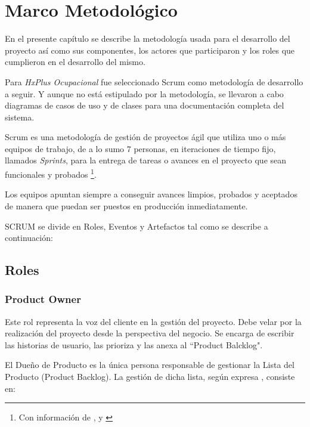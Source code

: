 \chapter{Marco Metodológico}

    En el presente capítulo se describe la metodología usada para el desarrollo del proyecto así como sus componentes, los actores que participaron y los roles que cumplieron en el desarrollo del mismo.

    Para \textit{HxPlus Ocupacional} fue seleccionado Scrum como metodología de desarrollo a seguir. Y aunque no está estipulado por la metodología, se llevaron a cabo diagramas de casos de uso y de clases para una documentación completa del sistema.
    
    Scrum es una metodología de gestión de proyectos ágil que utiliza uno o más equipos de trabajo, de a lo sumo 7 personas, en iteraciones de tiempo fijo, llamados \textit{Sprints}, para la entrega de tareas o avances en el proyecto que sean funcionales y probados
    \footnote{Con información de \citeauthor{scrum-guia}\cite{scrum-guia}, \citeauthor{scrum-primer}\cite{scrum-primer} y \citeauthor{scrum-agile}\cite{scrum-agile}}.    
    
    Los equipos apuntan siempre a conseguir avances limpios, probados y aceptados de manera que puedan ser puestos en producción inmediatamente.
    
    SCRUM se divide en Roles, Eventos y Artefactos tal como se describe a continuación:

    \section{Roles}
        
        \subsection{Product Owner}
        \label{product-owner}
        
        Este rol representa la voz del cliente en la gestión del proyecto. Debe velar por la realización del proyecto desde la perspectiva del negocio. Se encarga de escribir las historias de usuario, las prioriza y las anexa al ``Product Balcklog".
        
        El Dueño de Producto es la única persona responsable de gestionar la Lista del Producto (Product Backlog). La gestión de dicha lista, según expresa \citeauthor{scrum-guia}\cite{scrum-guia}, consiste en:
        

